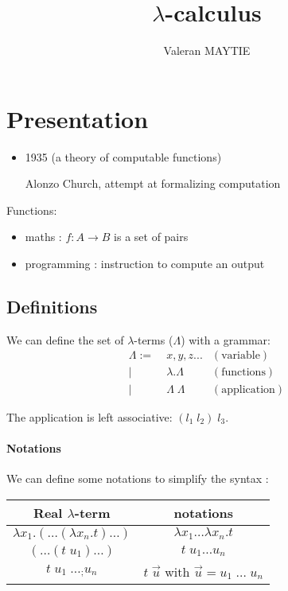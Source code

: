 \documentclass{article}
\title{$\lambda$-calculus}
\author{Valeran MAYTIE}
\date{}
\theoremstyle{plain}
\theoremstyle{plain}
\begin{document}
  \maketitle

  \tableofcontents

  \newpage
  \section{Presentation}

  \begin{itemize}
    \item 1935 (a theory of computable functions)

      Alonzo Church, attempt at formalizing computation
  \end{itemize}

  Functions:
  \begin{itemize}
    \item maths : $f : A \to B$ is a set of pairs
    \item programming : instruction to compute an output
  \end{itemize}

  \subsection{Definitions}

  We can define the set of $\lambda$-terms ($\Lambda$) with a grammar:
  \begin{align*}
    \Lambda :=&\; x, y, z ...         & (\text{variable}) \\
             |&\; \lambda. \Lambda    & (\text{functions}) \\
             |&\; \Lambda\; \Lambda   & (\text{application})
  \end{align*}

  The application is left associative: $(l_1\; l_2)\; l_3$.

  \paragraph{Notations} We can define some notations to simplify the syntax :

  \begin{center}
  \begin{tabular}{ c|c }
    Real $\lambda$-term & notations \\
    \hline
    $\lambda x_1.(\ldots(\lambda x_n. t)\ldots)$ & $\lambda x_1 \ldots
    \lambda x_n. t$ \\
    $(\ldots (t\; u_1)\ldots)$ & $t\;u_1 \ldots u_n$ \\
    $t\; u_1\; \ldots_; u_n$ & $t\; \vec{u}$ with $\vec u = u_1\; \ldots\; u_n$
  \end{tabular}
  \end{center}
\end{document}
